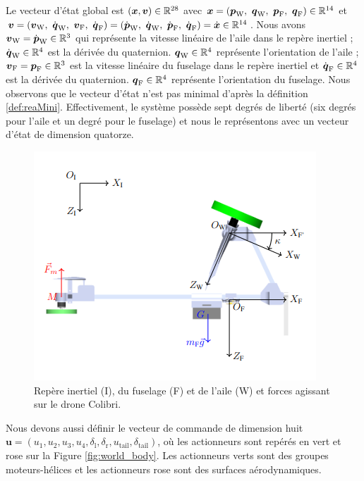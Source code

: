 Le vecteur d'état global est $(\boldsymbol{x},\boldsymbol{v}) \in {\mathbb R}^{28}$ avec $\boldsymbol{x}=(\boldsymbol{p}_{\text{W}},~\boldsymbol{q}_{\text{W}},~\boldsymbol{p}_{\text{F}},~\boldsymbol{q}_{\text{F}}) \in {\mathbb R}^{14}$ et $\boldsymbol{v}=(\boldsymbol{v}_{\text{W}},~\dot{\boldsymbol{q}}_{\text{W}},~\boldsymbol{v}_{\text{F}},~\dot{\boldsymbol{q}}_{\text{F}}) = (\dot{\boldsymbol{p}}_{\text{W}},~\dot{\boldsymbol{q}}_{\text{W}},~\dot{\boldsymbol{p}}_{\text{F}},~\dot{\boldsymbol{q}}_{\text{F}})=\dot{\boldsymbol{x}} \in {\mathbb R}^{14}$. Nous avons $\boldsymbol{v}_{\text{W}} = \dot{\boldsymbol{p}}_{\text{W}} \in {\mathbb R}^{3}$ qui représente la vitesse linéaire de l'aile dans le repère inertiel ; $\dot{\boldsymbol{q}}_{\text{W}} \in {\mathbb R}^{4}$  est la dérivée du quaternion. $\boldsymbol{q}_{\text{W}} \in {\mathbb R}^{4}$ représente l'orientation de l'aile ; $\boldsymbol{v}_{\text{F}} =\boldsymbol{p}_{\text{F}} \in {\mathbb R}^{3}$  est la vitesse linéaire du fuselage dans le repère inertiel et $\dot{\boldsymbol{q}}_{\text{F}} \in {\mathbb R}^{4}$  est la dérivée du quaternion. $\boldsymbol{q}_{\text{F}} \in {\mathbb R}^{4}$ représente l'orientation du fuselage. Nous observons que le vecteur d'état n'est pas minimal d'après la définition \ref{def:reaMini}. Effectivement, le système possède sept degrés de liberté (six degrés pour l'aile et un degré pour le fuselage) et nous le représentons avec un vecteur d'état de dimension quatorze.


\begin{figure}[ht!]
    \centering
    \includegraphics[width=0.6\columnwidth,angle=0,trim={0 0 0 0.5cm},clip]{figures/fram_side_colibri.png}
    \caption{Repère inertiel (I), du fuselage (F) et de l'aile (W) et forces agissant sur le drone Colibri.}
    \label{fig:colibri_frame_side}
\end{figure}


Nous devons aussi définir le vecteur de commande de dimension huit $\boldsymbol{u} = (u_{1},u_{2},u_{3},u_{4},\delta_{\text{l}},\delta_{\text{r}},u_{\text{tail}},\delta_{\text{tail}})$, où les actionneurs sont repérés en vert et rose sur la Figure \ref{fig:world_body}. Les actionneurs verts sont des groupes moteurs-hélices et les actionneurs rose sont des surfaces aérodynamiques. 

